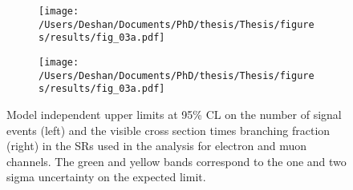 \begin{figure}[!htpb]
    \centering
    \begin{subfigure}[b]{0.49\textwidth}
        \centering
        \texttt{[image: /Users/Deshan/Documents/PhD/thesis/Thesis/figures/results/fig\_03a.pdf]}
        \label{fig:limit_n1}
    \end{subfigure}
    \begin{subfigure}[b]{0.49\textwidth}
        \centering
        \texttt{[image: /Users/Deshan/Documents/PhD/thesis/Thesis/figures/results/fig\_03a.pdf]}
        \label{fig:limit_n2}
    \end{subfigure}
    \caption[Model independent upper limits at 95\% CL on the number of signal events (left) and the visible cross section times branching fraction (right) in the SRs used in the analysis for electron and muon channels.]{Model independent upper limits at 95\% CL on the number of signal events (left) and the visible cross section times branching fraction (right) in the SRs used in the analysis for electron and muon channels. The green and yellow bands correspond to the one and two sigma uncertainty on the expected limit.}
    \label{fig:limit_n}
\end{figure}

